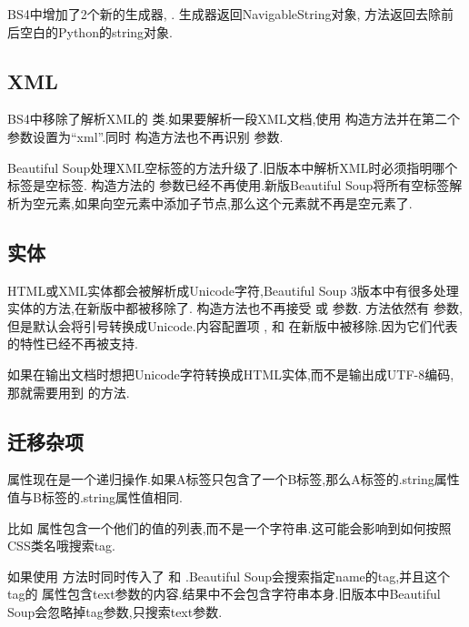 \documentclass[letterpaper,12pt,english]{sphinxmanual}
\begin{document}
BS4中增加了2个新的生成器, {\hyperref[index:strings\string-stripped\string-strings]{}} .  生成器返回NavigableString对象,  方法返回去除前后空白的Python的string对象.


\subsection{XML}
\label{index:id79}
BS4中移除了解析XML的  类.如果要解析一段XML文档,使用  构造方法并在第二个参数设置为“xml”.同时  构造方法也不再识别  参数.

Beautiful Soup处理XML空标签的方法升级了.旧版本中解析XML时必须指明哪个标签是空标签. 构造方法的  参数已经不再使用.新版Beautiful Soup将所有空标签解析为空元素,如果向空元素中添加子节点,那么这个元素就不再是空元素了.


\subsection{实体}
\label{index:id80}
HTML或XML实体都会被解析成Unicode字符,Beautiful Soup 3版本中有很多处理实体的方法,在新版中都被移除了.  构造方法也不再接受  或  参数. {\hyperref[index:unicode\string-dammit]{}} 方法依然有  参数,但是默认会将引号转换成Unicode.内容配置项  ,  和  在新版中被移除.因为它们代表的特性已经不再被支持.

如果在输出文档时想把Unicode字符转换成HTML实体,而不是输出成UTF-8编码,那就需要用到 {\hyperref[index:id51]{}} 的方法.


\subsection{迁移杂项}
\label{index:id81}
{\hyperref[index:string]{}} 属性现在是一个递归操作.如果A标签只包含了一个B标签,那么A标签的.string属性值与B标签的.string属性值相同.

{\hyperref[index:id15]{}} 比如  属性包含一个他们的值的列表,而不是一个字符串.这可能会影响到如何按照CSS类名哦搜索tag.

如果使用  方法时同时传入了 {\hyperref[index:id36]{}} 和 {\hyperref[index:id35]{}} .Beautiful Soup会搜索指定name的tag,并且这个tag的 {\hyperref[index:string]{}} 属性包含text参数的内容.结果中不会包含字符串本身.旧版本中Beautiful Soup会忽略掉tag参数,只搜索text参数.
\end{document}
